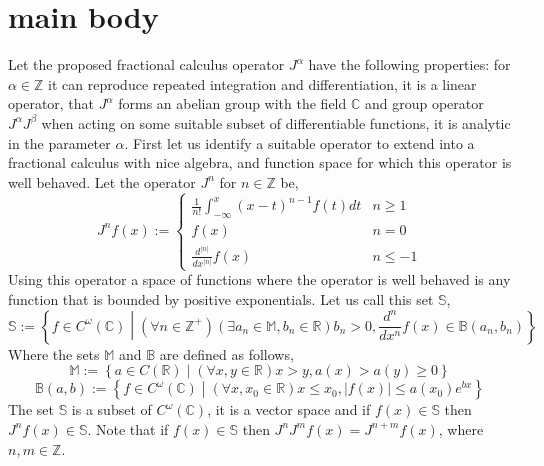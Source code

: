 \documentclass[%
 onecolumn,
 amsmath, amssymb, aps, pra, 10pt
]{revtex4-2}
\begin{document}
\section{main body}
Let the proposed fractional calculus operator $J^\alpha$ have the following properties: for $\alpha \in \mathbb{Z}$ it can reproduce repeated integration and differentiation, it is a linear operator, that $J^\alpha$ forms an abelian group with the field $\mathbb{C}$ and group operator $J^\alpha J^\beta$ when acting on some suitable subset of differentiable functions, it is analytic in the parameter $\alpha$. First let us identify a suitable operator to extend into a fractional calculus with nice algebra, and function space for which this operator is well behaved. Let the operator $J^n$ for $n \in \mathbb{Z}$ be,
\begin{equation}
J^n f(x) := \begin{cases} \frac{1}{n!}\int_{-\infty}^x (x - t)^{n - 1}f(t)dt & n \geq 1 \\ f(x) & n = 0 \\ \frac{d^{\left|n\right|}}{dx^{\left|n\right|}}f(x) & n \leq -1 \end{cases}
\label{integer_calculus}
\end{equation}
Using this operator a space of functions where the operator is well behaved is any function that is bounded by positive exponentials. Let us call this set $\mathbb{S}$,
\begin{equation}
\mathbb{S} := \left\lbrace f \in C^\omega(\mathbb{C}) \middle| (\forall n \in \mathbb{Z}^+)(\exists a_n \in \mathbb{M}, b_n \in \mathbb{R}) b_n > 0, \frac{d^n}{dx^n}f(x) \in \mathbb{B}(a_n, b_n) \right\rbrace
\label{exponentialy_bounded}
\end{equation}
Where the sets $\mathbb{M}$ and $\mathbb{B}$ are defined as follows,
\[\mathbb{M} := \left\lbrace a \in C(\mathbb{R}) \middle| (\forall x, y \in \mathbb{R}) x > y, a(x) > a(y) \geq 0 \right\rbrace\]
\[\mathbb{B}(a, b) := \left\lbrace f \in C^\omega(\mathbb{C}) \middle| (\forall x, x_0 \in \mathbb{R}) x \leq x_0, |f(x)| \leq a(x_0)e^{bx} \right\rbrace\]
The set $\mathbb{S}$ is a subset of $C^{\omega}(\mathbb{C})$, it is a vector space and if $f(x) \in \mathbb{S}$ then $J^n f(x) \in \mathbb{S}$. Note that if $f(x) \in \mathbb{S}$ then $J^n J^m f(x) = J^{n + m} f(x)$, where $n, m \in \mathbb{Z}$.
\end{document}
